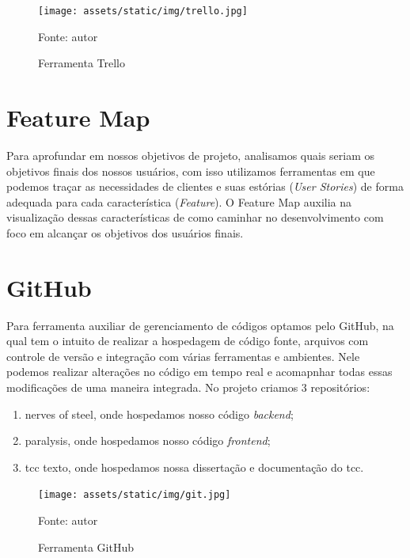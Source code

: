 \documentclass[../../layout.tex]{subfiles}
\begin{document}
\begin{figure}[H]
\centering
\caption{Ferramenta Trello}
\texttt{[image: assets/static/img/trello.jpg]}
\label{fig:trello}

\begin{minipage}{0.5\textwidth}
\raggedright \footnotesize Fonte: autor 
\end{minipage}
\end{figure}

\section{Feature Map}
\hspace*{3em}Para aprofundar em nossos objetivos de projeto, analisamos quais seriam os objetivos finais dos nossos usuários, com isso utilizamos ferramentas em que podemos traçar as necessidades de clientes e suas estórias (\emph{User Stories}) de forma adequada para cada característica (\emph{Feature}). O Feature Map auxilia na visualização dessas características de como caminhar no desenvolvimento com foco em alcançar os objetivos dos usuários finais.

\section{GitHub}
\hspace*{3em}Para ferramenta auxiliar de gerenciamento de códigos optamos pelo GitHub, na qual tem o intuito de realizar a hospedagem de código fonte, arquivos com controle de versão e integração com várias ferramentas e ambientes. Nele podemos realizar alterações no código em tempo real e acomapnhar todas essas modificações de uma maneira integrada. No projeto criamos 3 repositórios:

\begin{enumerate}[label=\alph*)]
\itemsep0em
    \item nerves of steel, onde hospedamos nosso código \emph{backend};
    \item paralysis, onde hospedamos nosso código \emph{frontend};
    \item tcc texto, onde hospedamos nossa dissertação e documentação do tcc.
\end{enumerate}

\begin{figure}[H]
\centering
\caption{Ferramenta GitHub}
\texttt{[image: assets/static/img/git.jpg]}
\label{fig:i2c_structure}

\begin{minipage}{0.5\textwidth}
\raggedright \footnotesize Fonte: autor 
\end{minipage}
\end{figure}
\end{document}
